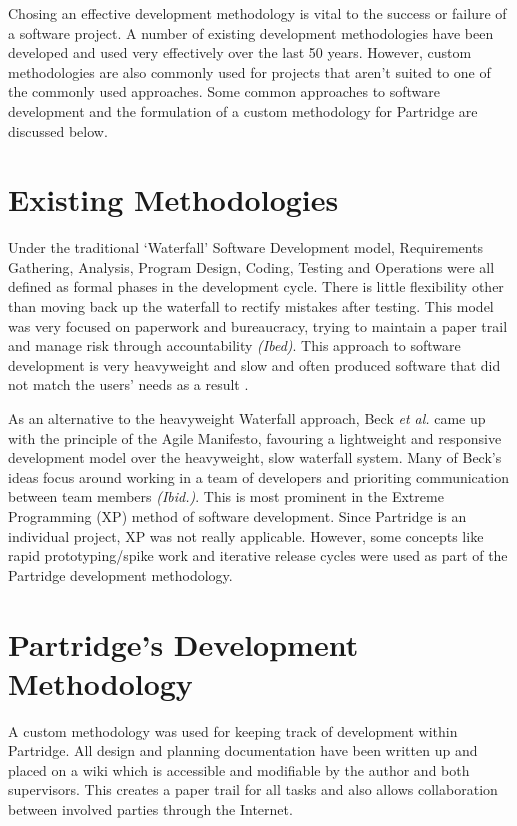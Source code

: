 Chosing an effective development methodology is vital to the
success or failure of a software project. A number of existing development
methodologies have been developed and used very effectively over the last 50
years. However, custom methodologies are also commonly used for projects that
aren't suited to one of the commonly used approaches. Some common approaches to
software development and the formulation of a custom methodology for Partridge
are discussed below.

\section{Existing Methodologies} 

Under the traditional `Waterfall' Software Development model, Requirements
Gathering, Analysis, Program Design, Coding, Testing and Operations were all
defined as formal phases in the development cycle. There is little flexibility
other than moving back up the waterfall to rectify mistakes after
testing\cite{Royce:1987:MDL:41765.41801}. This model was very focused on
paperwork and bureaucracy, trying to maintain a paper trail and manage risk
through accountability \emph{(Ibed)}. This approach to software development is
very heavyweight and slow and often produced software that did not match the
users' needs as a result \cite{Boehm1988}.

As an alternative to the heavyweight Waterfall approach, Beck \emph{et al.}
came up with the principle of the Agile Manifesto, favouring a lightweight and
responsive development model over the heavyweight, slow waterfall
system\cite{beck2001agile}. Many of Beck's ideas focus around working in a team
of developers and prioriting communication between team members \emph{(Ibid.)}.
This is most prominent in the Extreme Programming (XP) method of software
development. Since Partridge is an individual project, XP was not really
applicable. However, some concepts like rapid prototyping/spike work and
iterative release cycles were used as part of the Partridge development
methodology.

\section{ Partridge's Development Methodology}

A custom methodology was used for keeping track of development within
Partridge.  All design and planning documentation have been written up and
placed on a wiki which is accessible and modifiable by the author and both
supervisors. This creates a paper trail for all tasks and also allows
collaboration between involved parties through the Internet.

